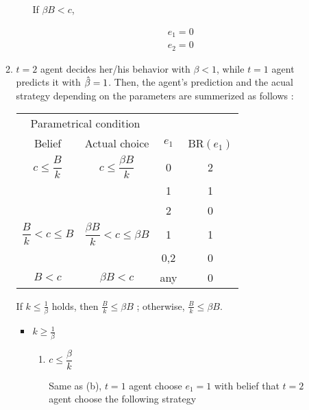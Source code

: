 \documentclass{jsarticle}
\begin{document}
\begin{enumerate}
\begin{enumerate}
\begin{itemize}
If $\beta B < c$,

\begin{align*}
e_1=0 \\
e_2=0
\end{align*}

\end{itemize}

\dotfill

\newpage

\item

$t=2$ agent decides her/his behavior with $\beta<1$, while $t=1$ agent predicts it with $\Hat{\beta}=1$. Then, the agent's prediction and the acual strategy depending on the parameters are summerized as follows :


\begin{center}

 \begin{tabular}{cccc} \hline
 \multicolumn{2}{c}{Parametrical condition} & & \\
 \multicolumn{1}{c}{Belief} & \multicolumn{1}{c}{Actual choice} & $e_1$ & BR$(e_1)$ \\ \hline
 $c \leq \dfrac{B}{k}$ & $c \leq \dfrac{\beta B}{k}$ & 0 &2 \\
  & & 1 & 1 \\
  & & 2 & 0 \\
 $\dfrac{B}{k} < c \leq B$ & $\dfrac{\beta B}{k} < c \leq \beta B$ & 1 &1 \\
  & & 0,2 & 0 \\
 $B < c$ & $\beta B < c$ & any & 0 \\ \hline
 \end{tabular}

\end{center}

\vspace{1zw}

If $k \leq \frac{1}{\beta}$ holds, then $\frac{B}{k} \leq \beta B$ ; otherwise, $\frac{B}{k} \leq \beta B$.

\begin{itemize}

\item $k \geq \frac{1}{\beta}$

 \begin{enumerate}
 
 \item $c \leq \dfrac{\beta}{k}$
 
 Same as (b), $t=1$ agent choose $e_1=1$ with belief that $t=2$ agent choose the following strategy
 

\end{enumerate}
\end{itemize}
\end{enumerate}
\end{enumerate}
\end{document}
